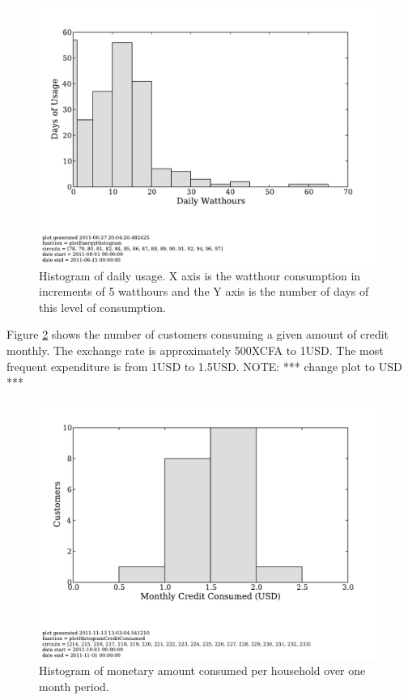 \documentclass[conference]{IEEEtran}
\newcommand{\note}[1]{{\color{red} NOTE: *** #1 ***}}
\begin{document}
\begin{figure}[]
\begin{center}
\includegraphics[trim = 0in 1.3in 0in 0in, clip, width=\columnwidth]
                {figures/ml06Histogram.pdf}
\end{center}
\caption{Histogram of daily usage.  X axis is the watthour consumption
in increments of 5 watthours and the Y axis is the number of days of
this level of consumption.}
\label{ml06Histogram}
\end{figure}

Figure \ref{consumptionHistogram} shows the number of customers consuming
a given amount of credit monthly.  The exchange rate is approximately 500XCFA to 1USD.
The most frequent expenditure is from 1USD to 1.5USD.
\note{change plot to USD}

\begin{figure}[]
\begin{center}
\includegraphics[trim = 0in 1.3in 0in 0in, clip, width=\columnwidth]
                {figures/consumptionHistogram.pdf}
\end{center}
\caption{Histogram of monetary amount consumed per household over one month period.}
\label{consumptionHistogram}
\end{figure}
\end{document}
